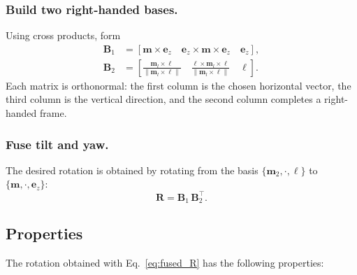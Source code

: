 \documentclass{IJCAS}
\begin{document}
\subsubsection{ Build two right-handed bases.}
Using cross products, form
\begin{align}
  \boldsymbol{B}_{1}
  &=
  \left[
    \boldsymbol{m}\times\boldsymbol{e}_{z}\quad
    \boldsymbol{e}_{z}\times\boldsymbol{m}\times\boldsymbol{e}_{z}\quad
    \boldsymbol{e}_{z}
  \right],\\
  \boldsymbol{B}_{2}
  &=
  \left[
    \frac{\boldsymbol{m}_{l}\times\boldsymbol{\ell}}
         {\|\boldsymbol{m}_{l}\times\boldsymbol{\ell}\|}\quad
    \frac{\boldsymbol{\ell}\times\boldsymbol{m}_{l}\times\boldsymbol{\ell}}
         {\|\boldsymbol{m}_{l}\times\boldsymbol{\ell}\|}\quad
    \boldsymbol{\ell}
  \right].
\end{align}
Each matrix is orthonormal: the first column is the chosen horizontal
vector, the third column is the vertical direction, and the second
column completes a right-handed frame.

\subsubsection{ Fuse tilt and yaw.}
The desired rotation is obtained by rotating from the basis
$\{\boldsymbol{m}_{2},\cdot,\boldsymbol{\ell}\}$ to
$\{\boldsymbol{m},\cdot,\boldsymbol{e}_{z}\}$:
\begin{equation}
  \boldsymbol{R} = \boldsymbol{B}_{1}\,\boldsymbol{B}_{2}^{\top}.
  \label{eq:fused_R}
\end{equation}



\subsection{Properties}

The rotation obtained with Eq.~\eqref{eq:fused_R} has the following
properties:
\end{document}
